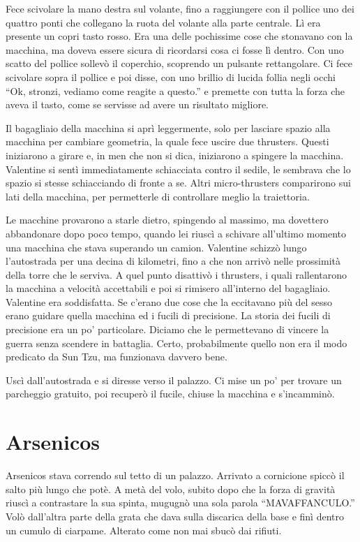     Fece scivolare la mano destra sul volante, fino a raggiungere con il pollice uno dei quattro ponti che collegano la
    ruota del volante alla parte centrale. Lì era presente un copri tasto rosso. Era una delle pochissime cose che
    stonavano con la macchina, ma doveva essere sicura di ricordarsi cosa ci fosse lì dentro. Con uno scatto del pollice
    sollevò il coperchio, scoprendo un pulsante rettangolare. Ci fece scivolare sopra il pollice e poi disse, con uno
    brillio di lucida follia negli occhi ``Ok, stronzi, vediamo come reagite a questo.'' e premette con tutta la forza
    che aveva il tasto, come se servisse ad avere un risultato migliore.

    Il bagagliaio della macchina si aprì leggermente, solo per lasciare spazio alla macchina per cambiare geometria, la
    quale fece uscire due thrusters. Questi iniziarono a girare e, in men che non si dica, iniziarono a spingere la
    macchina. Valentine si sentì immediatamente schiacciata contro il sedile, le sembrava che lo spazio si stesse
    schiacciando di fronte a se. Altri micro-thrusters comparirono sui lati della macchina, per permetterle di
    controllare meglio la traiettoria.
    
    Le macchine provarono a starle dietro, spingendo al massimo, ma dovettero abbandonare dopo poco tempo, quando lei
    riuscì a schivare all'ultimo momento una macchina che stava superando un camion. Valentine schizzò lungo
    l'autostrada per una decina di kilometri, fino a che non arrivò nelle prossimità della torre che le serviva. A quel
    punto disattivò i thrusters, i quali rallentarono la macchina a velocità accettabili e poi si rimisero all'interno
    del bagagliaio. Valentine era soddisfatta. Se c'erano due cose che la eccitavano più del sesso erano guidare quella
    macchina ed i fucili di precisione. La storia dei fucili di precisione era un po' particolare. Diciamo che le
    permettevano di vincere la guerra senza scendere in battaglia. Certo, probabilmente quello non era il modo predicato
    da Sun Tzu, ma funzionava davvero bene.

    Uscì dall'autostrada e si diresse verso il palazzo. Ci mise un po' per trovare un parcheggio gratuito, poi recuperò
    il fucile, chiuse la macchina e s'incamminò.

  \section*{Arsenicos}

    Arsenicos stava correndo sul tetto di un palazzo. Arrivato a cornicione spiccò il salto più lungo che potè. A metà
    del volo, subito dopo che la forza di gravità riuscì a contrastare la sua spinta, mugugnò una sola parola
    ``MAVAFFANCULO.'' Volò dall'altra parte della grata che dava sulla discarica della base e finì dentro un cumulo di
    ciarpame. Alterato come non mai sbucò dai rifiuti.

